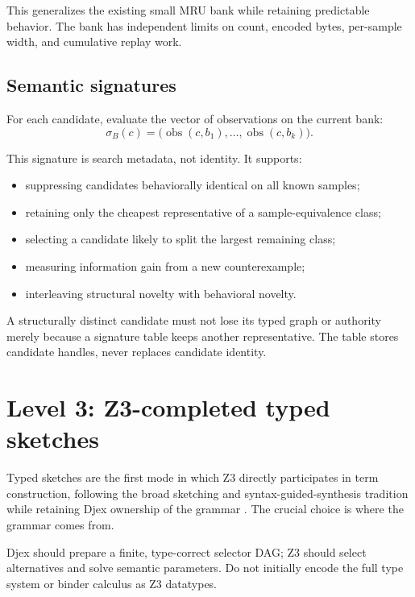\documentclass[11pt,oneside]{report}
\begin{document}
This generalizes the existing small MRU bank while retaining predictable behavior. The bank has independent limits on count, encoded bytes, per-sample width, and cumulative replay work.

\subsection{Semantic signatures}

For each candidate, evaluate the vector of observations on the current bank:
\[
  \sigma_B(c) = \bigl(\operatorname{obs}(c,b_1),\ldots,
                         \operatorname{obs}(c,b_k)\bigr).
\]

This signature is search metadata, not identity. It supports:

\begin{itemize}[leftmargin=2em]
\item suppressing candidates behaviorally identical on all known samples;
\item retaining only the cheapest representative of a sample-equivalence class;
\item selecting a candidate likely to split the largest remaining class;
\item measuring information gain from a new counterexample;
\item interleaving structural novelty with behavioral novelty.
\end{itemize}

A structurally distinct candidate must not lose its typed graph or authority merely because a signature table keeps another representative. The table stores candidate handles, never replaces candidate identity.

\section{Level 3: Z3-completed typed sketches}
\label{sec:typed-sketches}

Typed sketches are the first mode in which Z3 directly participates in term construction, following the broad sketching and syntax-guided-synthesis tradition while retaining Djex ownership of the grammar \cite{sketching,sygus}. The crucial choice is where the grammar comes from.

\begin{recommendation}
Djex should prepare a finite, type-correct selector DAG; Z3 should select alternatives and solve semantic parameters. Do not initially encode the full type system or binder calculus as Z3 datatypes.
\end{recommendation}
\end{document}
